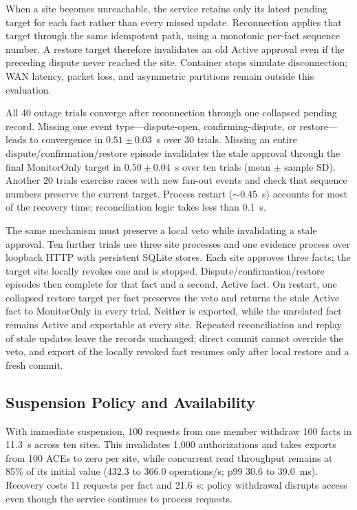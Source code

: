 \documentclass[journal]{IEEEtran}
\theoremstyle{definition}
\begin{document}
When a site becomes unreachable, the service retains only its latest pending target for each fact rather than every missed update. Reconnection applies that target through the same idempotent path, using a monotonic per-fact sequence number. A restore target therefore invalidates an old Active approval even if the preceding dispute never reached the site. Container stops simulate disconnection; WAN latency, packet loss, and asymmetric partitions remain outside this evaluation.

All 40 outage trials converge after reconnection through one collapsed pending record. Missing one event type---dispute-open, confirming-dispute, or restore---leads to convergence in $0.51\pm0.03$~s over 30 trials. Missing an entire dispute/confirmation/restore episode invalidates the stale approval through the final MonitorOnly target in $0.50\pm0.04$~s over ten trials (mean $\pm$ sample SD). Another 20 trials exercise races with new fan-out events and check that sequence numbers preserve the current target. Process restart ($\sim$0.45~s) accounts for most of the recovery time; reconciliation logic takes less than 0.1~s.

The same mechanism must preserve a local veto while invalidating a stale approval. Ten further trials use three site processes and one evidence process over loopback HTTP with persistent SQLite stores. Each site approves three facts; the target site locally revokes one and is stopped. Dispute/confirmation/restore episodes then complete for that fact and a second, Active fact. On restart, one collapsed restore target per fact preserves the veto and returns the stale Active fact to MonitorOnly in every trial. Neither is exported, while the unrelated fact remains Active and exportable at every site. Repeated reconciliation and replay of stale updates leave the records unchanged; direct commit cannot override the veto, and export of the locally revoked fact resumes only after local restore and a fresh commit.


\subsection{Suspension Policy and Availability}
\label{sec:suspension-policy}
With immediate suspension, 100 requests from one member withdraw 100 facts in 11.3~s across ten sites. This invalidates 1,000 authorizations and takes exports from 100 ACEs to zero per site, while concurrent read throughput remains at 85\% of its initial value (432.3 to 366.0 operations/s; p99 30.6 to 39.0~ms). Recovery costs 11 requests per fact and 21.6~s: policy withdrawal disrupts access even though the service continues to process requests.
\end{document}

